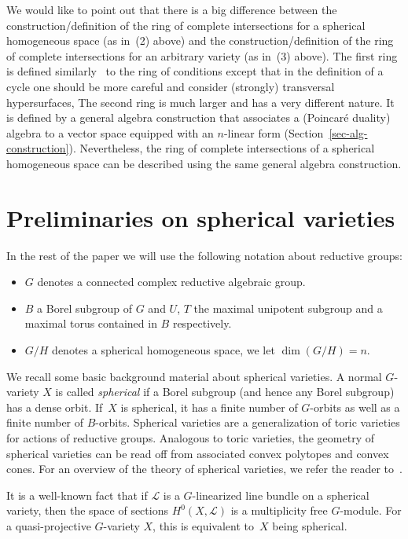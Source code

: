 \documentclass[10pt,a4paper]{amsart}
\numberwithin{equation}{section}
\theoremstyle{definition}
\begin{document}
We would like to point out that there is a big difference between the construction/definition of the ring of complete intersections for a spherical homogeneous space (as in~(2) above) and the construction/definition of the ring of complete intersections for an arbitrary variety (as in~(3) above). The first ring is defined similarly  to the ring of conditions except that in the definition of a cycle one should be more careful and consider (strongly) transversal hypersurfaces, The second ring is much larger and has a very different nature. It is defined by a general algebra construction that associates a (Poincar\'e duality) algebra to a vector space equipped with an $n$-linear form (Section~\ref{sec-alg-construction}). Nevertheless, the ring of complete intersections of a spherical homogeneous space can be described using the same general algebra construction.

\section{Preliminaries on spherical varieties}
In the rest of the paper we will use the following notation about reductive groups:
\begin{itemize}\itemsep=0pt
\item[--] $G$ denotes a connected complex reductive algebraic group.
\item[--] $B$ a Borel subgroup of $G$ and $U$, $T$ the maximal unipotent subgroup and a maximal torus contained in $B$ respectively.
\item[--] $G/H$ denotes a spherical homogeneous space, we let $\dim(G/H) = n$.
\end{itemize}

We recall some basic background material about spherical varieties. A normal $G$-variety $X$ is called \emph{spherical} if a Borel subgroup (and hence any Borel subgroup) has a dense orbit.
If~$X$ is spherical, it has a finite number of $G$-orbits as well as a finite number of
$B$-orbits. Spherical varieties are a generalization of toric varieties for actions of reductive groups. Analogous to toric varieties, the geometry of spherical varieties
can be read off from associated convex polytopes and convex cones. For an overview of the theory of spherical varieties, we refer the reader to~\cite{Perrin}.

It is a well-known fact that if ${\mathcal L}$ is a $G$-linearized line bundle on a spherical variety, then the space of sections $H^0(X, {\mathcal L})$ is a multiplicity free $G$-module.
For a quasi-projective $G$-variety $X$, this is equivalent to~$X$ being spherical.
\end{document}
